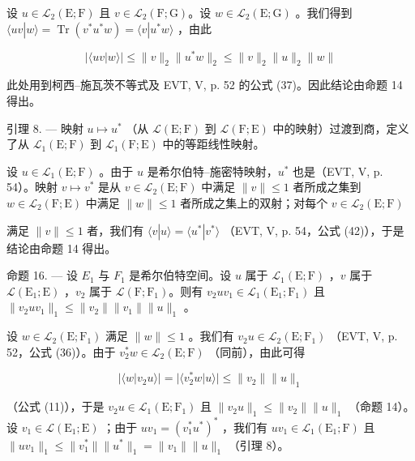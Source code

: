 设 \(u \in \mathcal{L}_2(\mathrm{E};\mathrm{F})\) 且 \(v \in \mathcal{L}_2(\mathrm{F};\mathrm{G})\)。设 \(w \in \mathcal{L}_2(\mathrm{E};\mathrm{G})\) 。我们得到 \(\langle uv | w \rangle = \operatorname{Tr}(v^* u^* w) = \langle v | u^* w \rangle\) ，由此

\[
| \langle u v | w \rangle | \leqslant \| v \| _ {2} \| u ^ {*} w \| _ {2} \leqslant \| v \| _ {2} \| u \| _ {2} \| w \|
\]

此处用到柯西--施瓦茨不等式及 EVT, V, p. 52 的公式 (37)。因此结论由命题 14 得出。

引理 8. --- 映射 \(u \mapsto u^{*}\) （从 \(\mathcal{L}(\mathrm{E};\mathrm{F})\) 到 \(\mathcal{L}(\mathrm{F};\mathrm{E})\) 中的映射）过渡到商，定义了从 \(\mathcal{L}_{1}(\mathrm{E};\mathrm{F})\) 到 \(\mathcal{L}_{1}(\mathrm{F};\mathrm{E})\) 中的等距线性映射。

设 \(u \in \mathcal{L}_1(\mathrm{E};\mathrm{F})\) 。由于 \(u\) 是希尔伯特--施密特映射，\(u^*\) 也是（EVT, V, p. 54）。映射 \(v \mapsto v^*\) 是从 \(v \in \mathcal{L}_2(\mathrm{E};\mathrm{F})\) 中满足 \(\|v\| \leqslant 1\) 者所成之集到 \(w \in \mathcal{L}_2(\mathrm{F};\mathrm{E})\) 中满足 \(\|w\| \leqslant 1\) 者所成之集上的双射；对每个 \(v \in \mathcal{L}_2(\mathrm{E};\mathrm{F})\)

满足 \(\|v\|\leqslant1\) 者，我们有 \(\langle v|u\rangle=\langle u^{*}|v^{*}\rangle\) （EVT, V, p. 54，公式 (42)），于是结论由命题 14 得出。

命题 16. --- 设 \(E_{1}\) 与 \(F_{1}\) 是希尔伯特空间。设 \(u\) 属于 \(\mathcal{L}_{1}(\mathrm{E};\mathrm{F})\) ，\(v\) 属于 \(\mathcal{L}(\mathrm{E}_{1};\mathrm{E})\) ，\(v_{2}\) 属于 \(\mathcal{L}(\mathrm{F};\mathrm{F}_{1})\)。则有 \(v_{2}uv_{1} \in \mathcal{L}_{1}(\mathrm{E}_{1};\mathrm{F}_{1})\) 且 \(\|v_{2}uv_{1}\|_{1} \leqslant \|v_{2}\|\|v_{1}\|\|u\|_{1}\) 。

设 \(w \in \mathcal{L}_2(\mathrm{E};\mathrm{F}_1)\) 满足 \(\| w\| \leqslant 1\) 。我们有 \(v_{2}u \in \mathcal{L}_{2}(\mathrm{E};\mathrm{F}_{1})\) （EVT, V, p. 52，公式 (36)）。由于 \(v_{2}^{*}w \in \mathcal{L}_{2}(\mathrm{E};\mathrm{F})\) （同前），由此可得

\[
| \langle w | v _ {2} u \rangle | = | \langle v _ {2} ^ {*} w | u \rangle | \leqslant \| v _ {2} \| \| u \| _ {1}
\]

（公式 (11)），于是 \(v_2u \in \mathcal{L}_1(\mathrm{E};\mathrm{F}_1)\) 且 \(\| v_2u\| _1 \leqslant \| v_2\| \| u\| _1\) （命题 14）。设 \(v_{1} \in \mathcal{L}(\mathrm{E}_{1};\mathrm{E})\) ；由于 \(uv_{1} = (v_{1}^{*}u^{*})^{*}\) ，我们有 \(uv_{1} \in \mathcal{L}_{1}(\mathrm{E}_{1};\mathrm{F})\) 且 \(\| uv_{1}\|_{1} \leqslant \| v_{1}^{*}\| \| u^{*}\|_{1} = \| v_{1}\| \| u\|_{1}\) （引理 8）。


